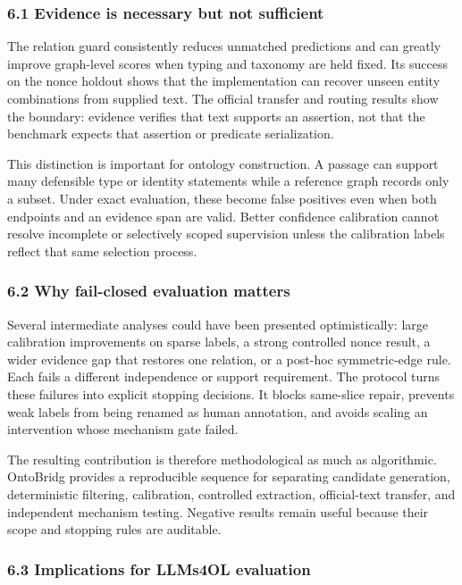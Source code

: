 \documentclass[
]{article}
\begin{document}
\subsubsection{6.1 Evidence is necessary but not
sufficient}\label{evidence-is-necessary-but-not-sufficient}

The relation guard consistently reduces unmatched predictions and can
greatly improve graph-level scores when typing and taxonomy are held
fixed. Its success on the nonce holdout shows that the implementation
can recover unseen entity combinations from supplied text. The official
transfer and routing results show the boundary: evidence verifies that
text supports an assertion, not that the benchmark expects that
assertion or predicate serialization.

This distinction is important for ontology construction. A passage can
support many defensible type or identity statements while a reference
graph records only a subset. Under exact evaluation, these become false
positives even when both endpoints and an evidence span are valid.
Better confidence calibration cannot resolve incomplete or selectively
scoped supervision unless the calibration labels reflect that same
selection process.

\subsubsection{6.2 Why fail-closed evaluation
matters}\label{why-fail-closed-evaluation-matters}

Several intermediate analyses could have been presented optimistically:
large calibration improvements on sparse labels, a strong controlled
nonce result, a wider evidence gap that restores one relation, or a
post-hoc symmetric-edge rule. Each fails a different independence or
support requirement. The protocol turns these failures into explicit
stopping decisions. It blocks same-slice repair, prevents weak labels
from being renamed as human annotation, and avoids scaling an
intervention whose mechanism gate failed.

The resulting contribution is therefore methodological as much as
algorithmic. OntoBridg provides a reproducible sequence for separating
candidate generation, deterministic filtering, calibration, controlled
extraction, official-text transfer, and independent mechanism testing.
Negative results remain useful because their scope and stopping rules
are auditable.

\subsubsection{6.3 Implications for LLMs4OL
evaluation}\label{implications-for-llms4ol-evaluation}
\end{document}
